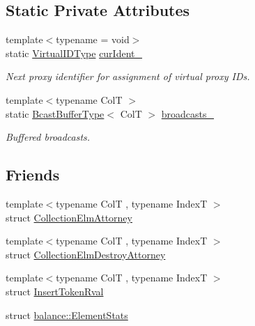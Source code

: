 \subsection*{Static Private Attributes}
\begin{DoxyCompactItemize}
\item 
{\footnotesize template$<$typename  = void$>$ }\\static \hyperlink{namespacevt_1_1vrt_a84d0891f52f70728c3fc2172cffb464b}{Virtual\+I\+D\+Type} \hyperlink{structvt_1_1vrt_1_1collection_1_1_collection_manager_affaf4ab1e9296a6ff1b7ad3c28a5e04e}{cur\+Ident\+\_\+}
\begin{DoxyCompactList}\small\item\em Next proxy identifier for assignment of virtual proxy I\+Ds. \end{DoxyCompactList}\item 
{\footnotesize template$<$typename ColT $>$ }\\static \hyperlink{structvt_1_1vrt_1_1collection_1_1_collection_manager_af3a8c8a3c37301a98aa62f265858a3c0}{Bcast\+Buffer\+Type}$<$ ColT $>$ \hyperlink{structvt_1_1vrt_1_1collection_1_1_collection_manager_a078bcfc68c63d4ac177243638f233a68}{broadcasts\+\_\+}
\begin{DoxyCompactList}\small\item\em Buffered broadcasts. \end{DoxyCompactList}\end{DoxyCompactItemize}
\subsection*{Friends}
\begin{DoxyCompactItemize}
\item 
{\footnotesize template$<$typename ColT , typename IndexT $>$ }\\struct \hyperlink{structvt_1_1vrt_1_1collection_1_1_collection_manager_aafd1972e5767dec26c8872f4aafa6864}{Collection\+Elm\+Attorney}
\item 
{\footnotesize template$<$typename ColT , typename IndexT $>$ }\\struct \hyperlink{structvt_1_1vrt_1_1collection_1_1_collection_manager_a4089cdff4218109fffb5884f51244a6e}{Collection\+Elm\+Destroy\+Attorney}
\item 
{\footnotesize template$<$typename ColT , typename IndexT $>$ }\\struct \hyperlink{structvt_1_1vrt_1_1collection_1_1_collection_manager_a43891fd66d429b4c9d8d01249f923b0b}{Insert\+Token\+Rval}
\item 
struct \hyperlink{structvt_1_1vrt_1_1collection_1_1_collection_manager_abdce9596911e092af07635bdcc13acd1}{balance\+::\+Element\+Stats}
\end{DoxyCompactItemize}
